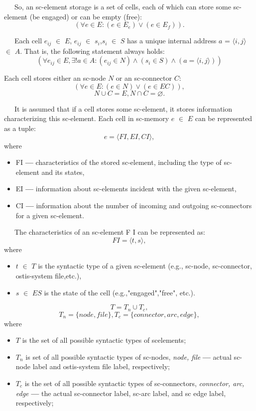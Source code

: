\documentclass[10pt, a4paper, twocolumn]{article}
\begin{document}
\par \ \ \ So, an sc-element storage is a set of cells, each of
which can store some sc-element (be engaged) or can be
empty (free):
\[
(\forall\textit{e} \in E : (e \in E_{e}) \vee (e \in E_{f})).
\]
\par \ \ \ Each cell $e_{ij}$ $\in$ $E$, $e_{ij}$ $\in$ $s_{i}$,$s_{i}$ $\in$ $S$ has a unique internal address $a$ = $\langle i,j \rangle$ $\in$ $A$. That is, the following
statement always holds:
\[
 (\forall e_{ij} \in E, \exists !a \in A : (e_{ij} \in N) \wedge (s_{i} \in S)\wedge (a = \langle i,j\rangle))
\]
\par Each cell stores either an sc-node $N$ or an sc-connector
$C$:
\[
(\forall\textit{e} \in E : (e \in N) \vee (e \in EC)),
\]
\[N \cup C = E, N \cap C = \varnothing .  \]
\par \ \ \ It is assumed that if a cell stores some sc-element, it stores information characterizing this sc-element. Each cell in sc-memory $e$ $\in$ $E$ can be represented as a tuple:
\[
e = \langle FI, EI, CI \rangle,
\]
where
\begin{itemize}[noitemsep,topsep=0pt,parsep=0pt,partopsep=0pt]
    \item FI \textbf{---} characteristics of the stored sc-element, including the type of sc-element and its states,
    \item EI \textbf{---} information about sc-elements incident with the given sc-element,
    \item CI \textbf{---} information about the number of incoming
and outgoing sc-connectors for a given sc-element.
\end{itemize}
\par \ \ \ The characteristics of an sc-element F I can be represented as:
\[
FI = \langle t,s \rangle, 
\]
where 
\begin{itemize}[noitemsep,topsep=0pt,parsep=0pt,partopsep=0pt]
    \item $t$ $\in$ $T$ is the syntactic type of a given sc-element (e.g., sc-node, sc-connector, ostis-system file,etc.),
    \item $s$ $\in$ $ES$ is the state of the 
 cell (e.g.,"engaged","free", etc.).
\end{itemize}
\[
T = T_{n} \cup T_{c},
\]
\[
T_{n} = \{ node, file\}, T_{c} = \{ connector, arc, edge \},
\]
where
\begin{itemize}[noitemsep,topsep=0pt,parsep=0pt,partopsep=0pt]
    \item $T$ is the set of all possible syntactic types of scelements;
    \item $T_{n}$ is set of all possible syntactic types of sc-nodes, \textit{node, file} \textbf{---} actual sc-node label and ostis-system
file label, respectively;
    \item $T_{c}$ is the set of all possible syntactic types of sc-connectors, \textit{connector, arc, edge} \textbf{---} the actual sc-connector label, sc-arc label, and sc edge label, respectively;
\end{itemize}
\end{document}
